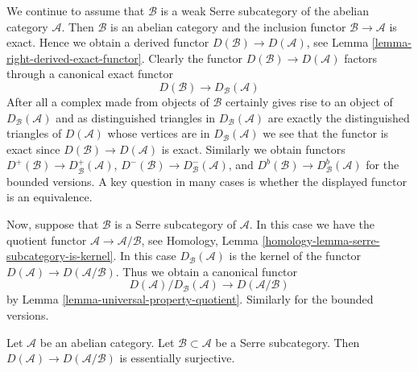 \noindent
We continue to assume that $\mathcal{B}$ is a weak Serre subcategory
of the abelian category $\mathcal{A}$. Then $\mathcal{B}$ is an abelian
category and the inclusion functor $\mathcal{B} \to \mathcal{A}$ is exact.
Hence we obtain a derived functor $D(\mathcal{B}) \to D(\mathcal{A})$, see
Lemma \ref{lemma-right-derived-exact-functor}. Clearly the
functor $D(\mathcal{B}) \to D(\mathcal{A})$ factors through a canonical
exact functor
\begin{equation}
\label{equation-compare}
D(\mathcal{B}) \longrightarrow D_\mathcal{B}(\mathcal{A})
\end{equation}
After all a complex made from objects of $\mathcal{B}$ certainly
gives rise to an object of $D_\mathcal{B}(\mathcal{A})$ and as
distinguished triangles in $D_\mathcal{B}(\mathcal{A})$ are exactly the
distinguished triangles of $D(\mathcal{A})$ whose vertices are in
$D_\mathcal{B}(\mathcal{A})$ we see that the functor is exact since
$D(\mathcal{B}) \to D(\mathcal{A})$ is exact. Similarly we obtain functors
$D^+(\mathcal{B}) \to D^+_\mathcal{B}(\mathcal{A})$,
$D^-(\mathcal{B}) \to D^-_\mathcal{B}(\mathcal{A})$, and
$D^b(\mathcal{B}) \to D^b_\mathcal{B}(\mathcal{A})$
for the bounded versions. A key question in many cases is whether the
displayed functor is an equivalence.

\medskip\noindent
Now, suppose that $\mathcal{B}$ is a Serre subcategory of $\mathcal{A}$.
In this case we have the quotient functor
$\mathcal{A} \to \mathcal{A}/\mathcal{B}$, see
Homology, Lemma \ref{homology-lemma-serre-subcategory-is-kernel}.
In this case $D_\mathcal{B}(\mathcal{A})$ is the kernel of the functor
$D(\mathcal{A}) \to D(\mathcal{A}/\mathcal{B})$.
Thus we obtain a canonical functor
$$
D(\mathcal{A})/D_\mathcal{B}(\mathcal{A})
\longrightarrow
D(\mathcal{A}/\mathcal{B})
$$
by
Lemma \ref{lemma-universal-property-quotient}.
Similarly for the bounded versions.

\begin{lemma}
\label{lemma-derived-of-quotient}
Let $\mathcal{A}$ be an abelian category.
Let $\mathcal{B} \subset \mathcal{A}$ be a Serre subcategory.
Then $D(\mathcal{A}) \to D(\mathcal{A}/\mathcal{B})$
is essentially surjective.
\end{lemma}

